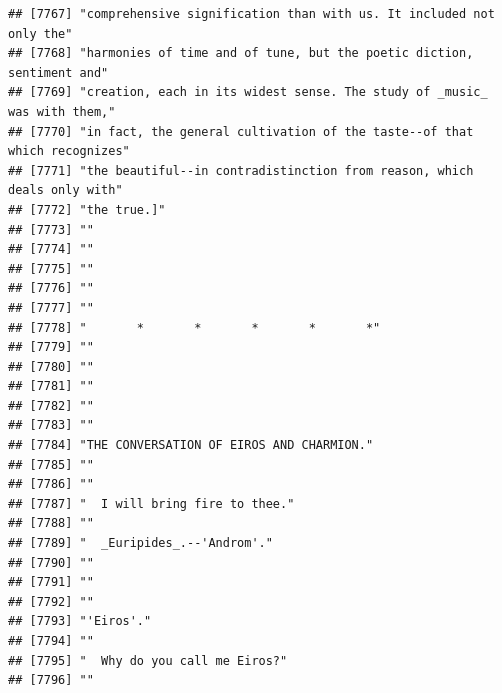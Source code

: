 \documentclass{article}\usepackage[]{graphicx}\usepackage[]{color}
\makeatletter
\newenvironment{kframe}{%
 \def\at@end@of@kframe{}%
 \ifinner\ifhmode%
  \def\at@end@of@kframe{\end{minipage}}%
  \begin{minipage}{\columnwidth}%
 \fi\fi%
 \def\FrameCommand##1{\hskip\@totalleftmargin \hskip-\fboxsep
 \colorbox{shadecolor}{##1}\hskip-\fboxsep
     \hskip-\linewidth \hskip-\@totalleftmargin \hskip\columnwidth}%
 \MakeFramed {\advance\hsize-\width
   \@totalleftmargin\z@ \linewidth\hsize
   \@setminipage}}%
 {\par\unskip\endMakeFramed%
 \at@end@of@kframe}
\newenvironment{knitrout}{}{} %
\makeatother
\begin{document}
\begin{knitrout}
\begin{kframe}
\begin{verbatim}
## [7767] "comprehensive signification than with us. It included not only the"          
## [7768] "harmonies of time and of tune, but the poetic diction, sentiment and"        
## [7769] "creation, each in its widest sense. The study of _music_ was with them,"     
## [7770] "in fact, the general cultivation of the taste--of that which recognizes"     
## [7771] "the beautiful--in contradistinction from reason, which deals only with"      
## [7772] "the true.]"                                                                  
## [7773] ""                                                                            
## [7774] ""                                                                            
## [7775] ""                                                                            
## [7776] ""                                                                            
## [7777] ""                                                                            
## [7778] "       *       *       *       *       *"                                    
## [7779] ""                                                                            
## [7780] ""                                                                            
## [7781] ""                                                                            
## [7782] ""                                                                            
## [7783] ""                                                                            
## [7784] "THE CONVERSATION OF EIROS AND CHARMION."                                     
## [7785] ""                                                                            
## [7786] ""                                                                            
## [7787] "  I will bring fire to thee."                                                
## [7788] ""                                                                            
## [7789] "  _Euripides_.--'Androm'."                                                   
## [7790] ""                                                                            
## [7791] ""                                                                            
## [7792] ""                                                                            
## [7793] "'Eiros'."                                                                    
## [7794] ""                                                                            
## [7795] "  Why do you call me Eiros?"                                                 
## [7796] ""                                                                            

\end{verbatim}
\end{kframe}
\end{knitrout}
\end{document}
